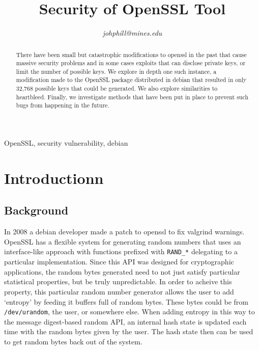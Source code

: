 \documentclass[conference]{IEEEtran}
\begin{document}
\title{Security of OpenSSL Tool}

\author{
\textit{johphill@mines.edu}\\
\and
{}
\and
{}
\and
{}
\and
{}
\and
{}
\and
{}
}

\maketitle

\begin{abstract}
There have been small but catastrophic modifications to openssl in the
past\cite{1}\cite{2}\cite{5} that cause massive security problems and
in some cases exploits that can disclose private keys, or limit the
number of possible keys. We explore in depth one such instance, a
modification made to the OpenSSL package distributed in debian that
resulted in only 32,768 possible keys that could be generated. We also
explore similarities to heartbleed. Finally, we investigate methods
that have been put in place to prevent such bugs from happening in the
future.
\end{abstract}

\begin{IEEEkeywords}
OpenSSL, security vulnerability, debian
\end{IEEEkeywords}

\section{Introductionn}
\subsection{Background}
In 2008 a debian developer made a patch to openssl to fix valgrind
warnings\cite{2}\cite{3}. OpenSSL has a flexible system for generating
random numbers that uses an interface-like approach with functions
prefixed with \verb|RAND_*| delegating to a particular
implementation. Since this API was designed for cryptographic
applications, the random bytes generated need to not just satisfy
particular statistical properties, but be truly unpredictable. In order
to acheive this property, this particular random number generator
allows the user to add `entropy' by feeding it buffers full of random
bytes. These bytes could be from \verb|/dev/urandom|, the user, or
somewhere else. When adding entropy in this way to the message
digest-based random API, an internal hash state is updated each time
with the random bytes given by the user. The hash state then can be
used to get random bytes back out of the system. 
\end{document}
